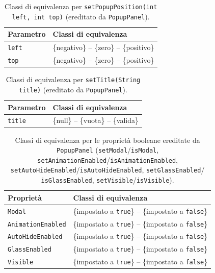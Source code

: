 \begin{table}[H]
\centering
\begin{tabularx}{\textwidth}{>{\raggedright\arraybackslash}p{} >{\raggedright\arraybackslash}X}
\toprule
Parametro & Classi di equivalenza \\
\midrule
\texttt{left} & \{negativo\} -- \{zero\} -- \{positivo\} \\
\texttt{top} & \{negativo\} -- \{zero\} -- \{positivo\} \\
\bottomrule
\end{tabularx}
\caption{Classi di equivalenza per \texttt{setPopupPosition(int left, int top)} (ereditato da
\texttt{PopupPanel}).}
\label{tab:logindialog-posizione-classi}
\end{table}

\begin{table}[H]
\centering
\begin{tabularx}{\textwidth}{>{\raggedright\arraybackslash}p{} >{\raggedright\arraybackslash}X}
\toprule
Parametro & Classi di equivalenza \\
\midrule
\texttt{title} & \{null\} -- \{vuota\} -- \{valida\} \\
\bottomrule
\end{tabularx}
\caption{Classi di equivalenza per \texttt{setTitle(String title)} (ereditato da
\texttt{PopupPanel}).}
\label{tab:logindialog-title-classi}
\end{table}

\begin{table}[H]
\centering
\begin{tabularx}{\textwidth}{>{\raggedright\arraybackslash}p{} >{\raggedright\arraybackslash}X}
\toprule
Proprietà & Classi di equivalenza \\
\midrule
\texttt{Modal} & \{impostato a \texttt{true}\} -- \{impostato a \texttt{false}\} \\
\texttt{AnimationEnabled} & \{impostato a \texttt{true}\} -- \{impostato a \texttt{false}\} \\
\texttt{AutoHideEnabled} & \{impostato a \texttt{true}\} -- \{impostato a \texttt{false}\} \\
\texttt{GlassEnabled} & \{impostato a \texttt{true}\} -- \{impostato a \texttt{false}\} \\
\texttt{Visible} & \{impostato a \texttt{true}\} -- \{impostato a \texttt{false}\} \\
\bottomrule
\end{tabularx}
\caption{Classi di equivalenza per le proprietà booleane ereditate da \texttt{PopupPanel}
(\texttt{setModal}/\texttt{isModal}, \texttt{setAnimationEnabled}/\texttt{isAnimationEnabled},
\texttt{setAutoHideEnabled}/\texttt{isAutoHideEnabled}, \texttt{setGlassEnabled}/
\texttt{isGlassEnabled}, \texttt{setVisible}/\texttt{isVisible}).}
\label{tab:logindialog-boolprop-classi}
\end{table}

